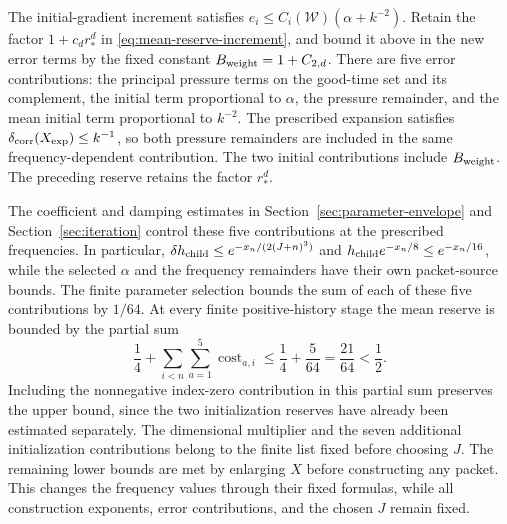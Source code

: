 \documentclass[11pt]{article}
\theoremstyle{definition}
\begin{document}
The initial-gradient increment satisfies
$e_i\leq C_i(\mathcal W)(\alpha+k^{-2})$.
Retain the factor $1+c_dr_*^d$ in
\eqref{eq:mean-reserve-increment}, and bound it above in the new
error terms by the fixed constant $B_{\rm weight}=1+C_{2,d}$.
There are five error contributions: the principal pressure
terms on the good-time set and its complement, the initial term
proportional to $\alpha$, the pressure remainder, and the mean initial
term proportional to $k^{-2}$. The prescribed
expansion satisfies $\delta_{\rm corr}(X_{\rm exp})\leq k^{-1}$, so
both pressure remainders are included in the same frequency-dependent
contribution. The two initial contributions include $B_{\rm weight}$.
The preceding reserve retains the factor $r_*^d$.

The coefficient and damping estimates in
Section~\ref{sec:parameter-envelope} and Section~\ref{sec:iteration}
control these five contributions at the prescribed frequencies. In particular,
$\delta h_{\rm child}\leq e^{-x_n/(2(J+n)^3)}$ and
$h_{\rm child}e^{-x_n/8}\leq e^{-x_n/16}$, while the selected
$\alpha$ and the frequency remainders have their own packet-source
bounds. The finite parameter selection bounds the sum of each of these
five contributions by $1/64$.
At every finite positive-history stage the mean reserve is bounded
by the partial sum
\[
 \frac14+\sum_{i<n}\sum_{a=1}^5\operatorname{cost}_{a,i}
 \leq\frac14+\frac5{64}=\frac{21}{64}<\frac12.
\]
Including the nonnegative index-zero contribution in this partial sum
preserves the upper bound, since the two initialization reserves have
already been estimated separately. The dimensional multiplier
and the seven additional initialization contributions belong to the finite
list fixed before choosing $J$. The remaining lower bounds are met
by enlarging $X$ before constructing any packet. This changes the
frequency values through their fixed formulas, while all construction
exponents, error contributions, and the chosen $J$ remain fixed.
\end{document}
